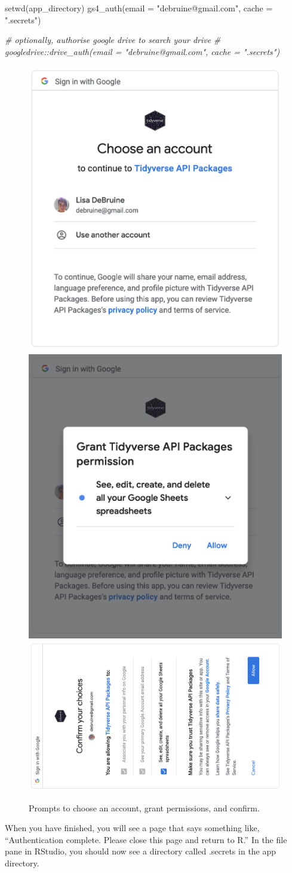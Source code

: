 \documentclass[
]{book}
\newenvironment{Shaded}{\begin{snugshade}}{\end{snugshade}}
\newcommand{\AttributeTok}[1]{\textcolor[rgb]{0.77,0.63,0.00}{#1}}
\newcommand{\CommentTok}[1]{\textcolor[rgb]{0.56,0.35,0.01}{\textit{#1}}}
\newcommand{\FunctionTok}[1]{\textcolor[rgb]{0.00,0.00,0.00}{#1}}
\newcommand{\NormalTok}[1]{#1}
\newcommand{\StringTok}[1]{\textcolor[rgb]{0.31,0.60,0.02}{#1}}
\begin{document}
\begin{Shaded}
\begin{Highlighting}[]
\FunctionTok{setwd}\NormalTok{(app\_directory)}
\FunctionTok{gs4\_auth}\NormalTok{(}\AttributeTok{email =} \StringTok{"debruine@gmail.com"}\NormalTok{, }\AttributeTok{cache =} \StringTok{".secrets"}\NormalTok{)}

\CommentTok{\# optionally, authorise google drive to search your drive}
\CommentTok{\# googledrive::drive\_auth(email = "debruine@gmail.com", cache = ".secrets")}
\end{Highlighting}
\end{Shaded}

\begin{figure}

{\centering \includegraphics[width=0.3\linewidth]{images/gs4_choose_account} \includegraphics[width=0.3\linewidth]{images/gs4_auth} \includegraphics[width=0.3\linewidth]{images/gs4_confirm_auth} 

}

\caption{Prompts to choose an account, grant permissions, and confirm.}\label{fig:gs4-auth}
\end{figure}

When you have finished, you will see a page that says something like, ``Authentication complete. Please close this page and return to R.'' In the file pane in RStudio, you should now see a directory called .secrets in the app directory.
\end{document}
